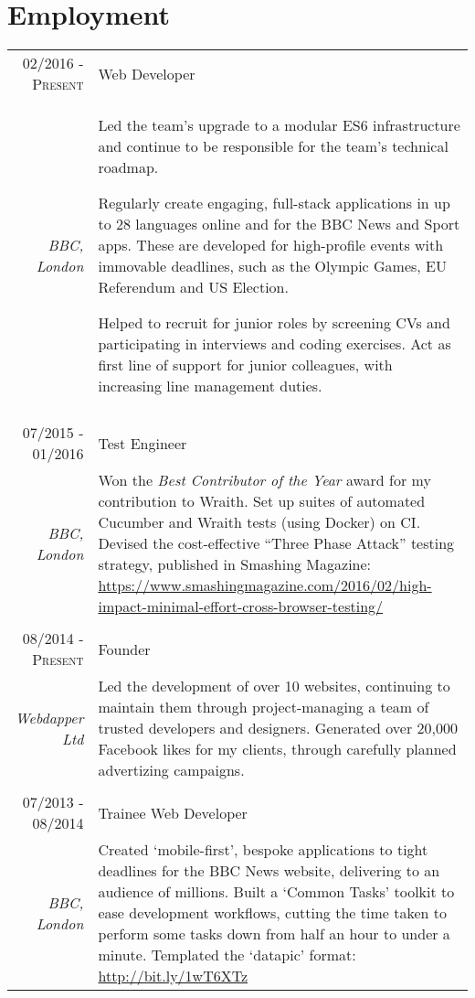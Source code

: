 \documentclass[class=article, crop=false]{standalone}
\begin{document}
\section{Employment}
\begin{tabular}{r|p{11cm}}
\textsc{02/2016 - Present}
&Web Developer
\\\emph{BBC, London}
&\footnotesize{
\par{Led the team's upgrade to a modular ES6 infrastructure and continue to be responsible for the team's technical roadmap.}
\par{Regularly create engaging, full-stack applications in up to 28 languages online and for the BBC News and Sport apps. These are developed for high-profile events with immovable deadlines, such as the Olympic Games, EU Referendum and US Election.}
\par{Helped to recruit for junior roles by screening CVs and participating in interviews and coding exercises. Act as first line of support for junior colleagues, with increasing line management duties.}
}
\\\multicolumn{2}{c}{} \\
\textsc{07/2015 - 01/2016}
&Test Engineer
\\\emph{BBC, London}
&\footnotesize{
Won the \emph{Best Contributor of the Year} award for my contribution to Wraith. Set up suites of automated Cucumber and Wraith tests (using Docker) on CI.  Devised the cost-effective ``Three Phase Attack'' testing strategy, published in Smashing Magazine:
\url{https://www.smashingmagazine.com/2016/02/high-impact-minimal-effort-cross-browser-testing/}
}
\\\multicolumn{2}{c}{} \\
\textsc{08/2014 - Present}
&Founder
\\\emph{Webdapper Ltd}
&\footnotesize{Led the development of over 10 websites, continuing to maintain them through project-managing a team of trusted developers and designers. Generated over 20,000 Facebook likes for my clients, through carefully planned advertizing campaigns.}
\\\multicolumn{2}{c}{} \\
\textsc{07/2013 - 08/2014}
&Trainee Web Developer
\\\emph{BBC, London}
&\footnotesize{Created `mobile-first', bespoke applications to tight deadlines for the BBC News website, delivering to an audience of millions. Built a `Common Tasks' toolkit to ease development workflows, cutting the time taken to perform some tasks down from half an hour to under a minute. Templated the ‘datapic’ format: \url{http://bit.ly/1wT6XTz}}
\end{tabular}
\end{document}
